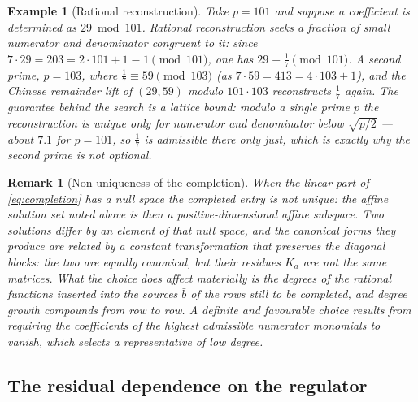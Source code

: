 \documentclass[11pt]{article}
\newtheorem{example}[definition]{Example}
\newtheorem{remark}[definition]{Remark}
\begin{document}
\begin{example}[Rational reconstruction]
Take $p = 101$ and suppose a coefficient is determined as
$29 \bmod 101$.  Rational reconstruction seeks a fraction of small
numerator and denominator congruent to it: since
$7 \cdot 29 = 203 = 2\cdot 101 + 1 \equiv 1 \pmod{101}$, one has
$29 \equiv \tfrac{1}{7} \pmod{101}$.  A second prime, $p = 103$,
where $\tfrac17 \equiv 59 \pmod{103}$ (as $7 \cdot 59 = 413 =
4\cdot103+1$), and the Chinese remainder lift of $(29, 59)$ modulo
$101\cdot103$ reconstructs $\tfrac17$ again.  The guarantee behind
the search is a lattice bound: modulo a single prime $p$ the
reconstruction is unique only for numerator and denominator below
$\sqrt{p/2}$ --- about $7.1$ for $p = 101$, so $\tfrac17$ is
admissible there only just, which is exactly why the second prime is
not optional.
\end{example}

\begin{remark}[Non-uniqueness of the completion]
\label{rem:representative}
When the linear part of \eqref{eq:completion} has a null space the
completed entry is not unique: the affine solution set noted above is
then a positive-dimensional affine subspace.  Two solutions differ by
an element of that null space, and the canonical forms they produce
are related by a constant
transformation that preserves the diagonal blocks: the two are
equally canonical, but their residues $K_a$ are not the same
matrices.  What the choice does affect materially is the degrees of
the rational functions inserted into the sources $\bar b$ of the rows
still to be completed, and degree growth compounds from row to row.
A definite and favourable choice results from requiring the
coefficients of the highest admissible numerator monomials to vanish,
which selects a representative of low degree.
\end{remark}

\subsection{The residual dependence on the regulator}
\label{sec:constT}
\end{document}
